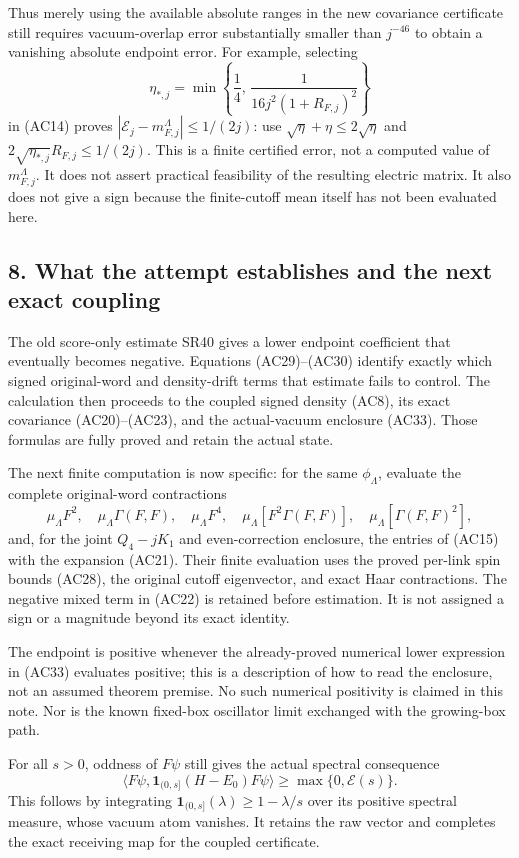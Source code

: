 \documentclass[11pt]{article}
\begin{document}
Thus merely using the available absolute ranges in the new covariance certificate still requires vacuum-overlap error substantially smaller than \(j^{-46}\) to obtain a vanishing absolute endpoint error. For example, selecting
\[
 \eta_{*,j}=\min\left\{\frac14,\,
       \frac{1}{16j^2(1+R_{F,j})^2}\right\}
 \tag{AC38}
\]
in (AC14) proves \(|\mathcal E_j-m_{F,j}^\Lambda|\le1/(2j)\): use \(\sqrt{\eta}+\eta\le2\sqrt{\eta}\) and
\(2\sqrt{\eta_{*,j}}R_{F,j}\le1/(2j)\).
This is a finite certified error, not a computed value of \(m_{F,j}^\Lambda\). It does not assert practical feasibility of the resulting electric matrix. It also does not give a sign because the finite-cutoff mean itself has not been evaluated here.

\subsection*{8. What the attempt establishes and the next exact coupling}

The old score-only estimate SR40 gives a lower endpoint coefficient that eventually becomes negative. Equations (AC29)–(AC30) identify exactly which signed original-word and density-drift terms that estimate fails to control. The calculation then proceeds to the coupled signed density (AC8), its exact covariance (AC20)–(AC23), and the actual-vacuum enclosure (AC33). Those formulas are fully proved and retain the actual state.

The next finite computation is now specific: for the same \(\phi_\Lambda\), evaluate the complete original-word contractions
\[
 \mu_\Lambda F^2,\quad
 \mu_\Lambda\Gamma(F,F),\quad
 \mu_\Lambda F^4,\quad
 \mu_\Lambda[F^2\Gamma(F,F)],\quad
 \mu_\Lambda[\Gamma(F,F)^2],
 \tag{AC39}
\]
and, for the joint \(Q_4-jK_1\) and even-correction enclosure, the entries of (AC15) with the expansion (AC21). Their finite evaluation uses the proved per-link spin bounds (AC28), the original cutoff eigenvector, and exact Haar contractions. The negative mixed term in (AC22) is retained before estimation. It is not assigned a sign or a magnitude beyond its exact identity.

The endpoint is positive whenever the already-proved numerical lower expression in (AC33) evaluates positive; this is a description of how to read the enclosure, not an assumed theorem premise. No such numerical positivity is claimed in this note. Nor is the known fixed-box oscillator limit exchanged with the growing-box path.

For all \(s>0\), oddness of \(F\psi\) still gives the actual spectral consequence
\[
 \langle F\psi,\mathbf1_{(0,s]}(H-E_0)F\psi\rangle
 \ge\max\{0,\mathcal E(s)\}.
 \tag{AC40}
\]
This follows by integrating \(\mathbf1_{(0,s]}(\lambda)\ge1-\lambda/s\) over its positive spectral measure, whose vacuum atom vanishes. It retains the raw vector and completes the exact receiving map for the coupled certificate.
\end{document}

